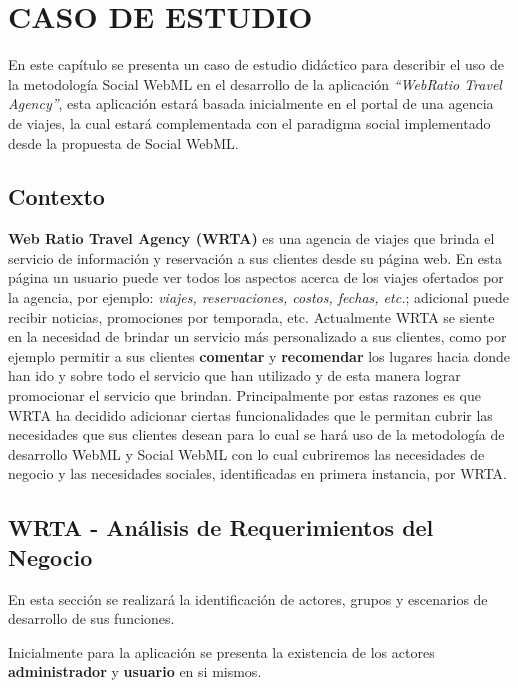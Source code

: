 \documentclass[oneside,12pt,a4paper]{memoir}%
\begin{document}
 				
\chapter{CASO DE ESTUDIO}	
\label{chap:studyCase}	
En este cap\'itulo se presenta un caso de estudio did\'actico para describir el
uso de la metodolog\'ia Social WebML en el desarrollo de la aplicaci\'on
\textit{``WebRatio Travel Agency''}, esta aplicaci\'on estar\'a basada
inicialmente en el portal de una agencia de viajes, la cual estar\'a
complementada con el paradigma social implementado desde la propuesta de Social
WebML.

	\section{Contexto}
	\label{sec:context}
	\textbf{Web Ratio Travel Agency (WRTA)} es una agencia de viajes que brinda
	el servicio de informaci\'on y reservaci\'on a sus clientes desde su p\'agina web. 
	En esta p\'agina un usuario puede ver todos los aspectos acerca de los viajes
	ofertados por la agencia, por ejemplo: \textit{viajes, reservaciones, costos,
	fechas, etc.}; adicional puede recibir noticias, promociones por temporada,
	etc.
	Actualmente WRTA se siente en la necesidad de brindar un servicio m\'as
	personalizado a sus clientes, como por ejemplo permitir a sus clientes
	\textbf{comentar} y \textbf{recomendar} los lugares hacia donde han ido y
	sobre todo el servicio que han utilizado y de esta manera lograr promocionar el
	servicio que brindan. 
	Principalmente por estas razones es que WRTA ha decidido adicionar ciertas
	funcionalidades que le permitan cubrir las necesidades que sus clientes
	desean para lo cual se har\'a uso de la metodolog\'ia de desarrollo \ac{WebML}
	y Social WebML con lo cual cubriremos las necesidades de negocio y las
	necesidades sociales, identificadas en primera instancia, por WRTA.
	
	\section{WRTA - An\'alisis de Requerimientos del Negocio}
	\label{sec:reqAnalysis}
		
	En esta secci\'on se realizar\'a la identificaci\'on de actores, grupos  y
	escenarios de desarrollo de sus funciones.
	
	Inicialmente para la aplicaci\'on se presenta la existencia de los actores
	\textbf{administrador} y \textbf{usuario} en si mismos.
	
\end{document}
